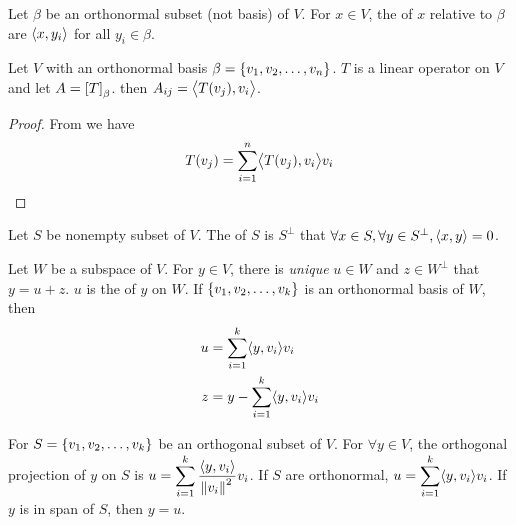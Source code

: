 \begin{definition}
    Let $\beta$ be an orthonormal subset (not basis) of $V$. For $x \in V$, the  of $x$ relative to $\beta$ are $\innerproduct{x}{y_i}$ for all $y_i \in \beta$.
\end{definition}


\begin{theorem}\label{matrixelementasinnerproductresult}
	Let $V$ with an orthonormal basis $\beta=\set{v_1,v_2,\dots,v_n}$. $T$ is a linear operator on $V$ and let $A= \coordinate{T}_\beta$. then $A_{ij}=\innerproduct{T(v_j)}{v_i}$.
\end{theorem}
\begin{proof}
	From  we have
	\begin{equation*}
		T(v_j) = \sum_{i=1}^n \innerproduct{T(v_j)}{v_i} v_i
	\end{equation*}
\end{proof}

\begin{definition}
    Let $S$ be nonempty subset of $V$. The  of $S$ is $S^\bot$ that $\forall x \in S, \forall y \in S^\bot, \innerproduct{x}{y} = 0$.
\end{definition}

\begin{theorem}\label{orthogonalprojection}
    Let $W$ be a subspace of $V$. For $y \in V$, there is \emph{unique} $u \in W$ and $z \in W^\bot$ that $y = u + z$. $u$ is the  of $y$ on $W$. If $\set{v_1, v_2, \dots, v_k}$ is an orthonormal basis of $W$, then 
    \begin{equation}
        \begin{aligned}
            u &= \sum_{i=1}^k \innerproduct{y}{v_i} v_i \\
            z &= y -   \sum_{i=1}^k \innerproduct{y}{v_i} v_i          
        \end{aligned}
    \end{equation}
\end{theorem}


\begin{theorem}
    For $S=\set{v_1, v_2, \dots, v_k}$ be an orthogonal subset of $V$. For $\forall y \in V$, the orthogonal projection of $y$ on $S$ is $\displaystyle u = \sum_{i=1}^k \dfrac{\innerproduct{y}{v_i}}{\norm{v_i}^2} v_i$. If $S$ are orthonormal, $\displaystyle u = \sum_{i=1}^k \innerproduct{y}{v_i} v_i$. If $y$ is in span of $S$, then $y = u$.
\end{theorem}



